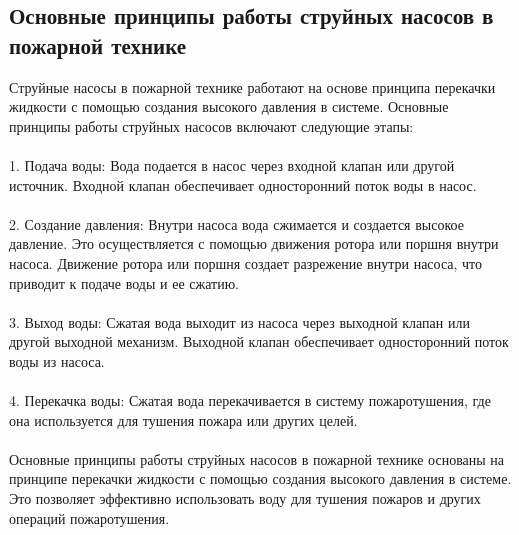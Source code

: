 \documentclass{article}
\begin{document}
\subsection{Основные принципы работы струйных насосов в пожарной технике}
Струйные насосы в пожарной технике работают на основе принципа перекачки жидкости с помощью создания высокого давления в системе. Основные принципы работы струйных насосов включают следующие этапы:\\
~\\
1. Подача воды: Вода подается в насос через входной клапан или другой источник. Входной клапан обеспечивает односторонний поток воды в насос.\\
~\\
2. Создание давления: Внутри насоса вода сжимается и создается высокое давление. Это осуществляется с помощью движения ротора или поршня внутри насоса. Движение ротора или поршня создает разрежение внутри насоса, что приводит к подаче воды и ее сжатию.\\
~\\
3. Выход воды: Сжатая вода выходит из насоса через выходной клапан или другой выходной механизм. Выходной клапан обеспечивает односторонний поток воды из насоса.\\
~\\
4. Перекачка воды: Сжатая вода перекачивается в систему пожаротушения, где она используется для тушения пожара или других целей.\\
~\\
Основные принципы работы струйных насосов в пожарной технике основаны на принципе перекачки жидкости с помощью создания высокого давления в системе. Это позволяет эффективно использовать воду для тушения пожаров и других операций пожаротушения.
\end{document}

